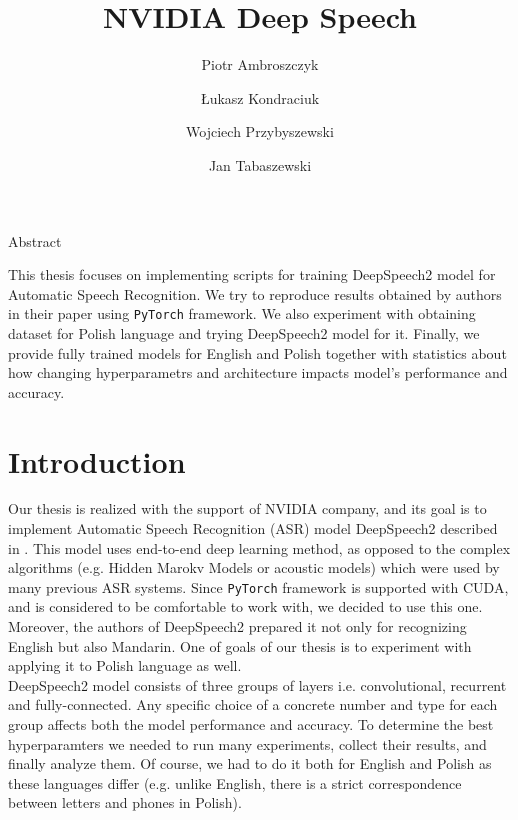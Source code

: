 ﻿\documentclass[11pt,a4paper]{article}
\title{NVIDIA Deep Speech}
\author{Piotr Ambroszczyk
\and Łukasz Kondraciuk
\and Wojciech Przybyszewski
\and Jan Tabaszewski}
\date{}
\begin{document}
\begin{titlingpage}
\maketitle
\end{titlingpage}

\begin{center}
Abstract
\end{center}
This thesis focuses on implementing scripts for training DeepSpeech2 model for Automatic Speech Recognition. We try to reproduce results obtained by authors in their paper using \texttt{PyTorch} framework. We also experiment with obtaining dataset for Polish language and trying DeepSpeech2 model for it. Finally, we provide fully trained models for English and Polish together with statistics about how changing hyperparametrs and architecture impacts model's performance and accuracy.
\newpage

\tableofcontents
\newpage

\section{Introduction}

Our thesis is realized with the support of NVIDIA company, and its goal is to implement Automatic Speech Recognition (ASR) model DeepSpeech2 described in \cite{DS2}. This model uses end-to-end deep learning method, as opposed to the complex algorithms (e.g. Hidden Marokv Models or acoustic models) which were used by many previous ASR systems. Since \texttt{PyTorch} framework is supported with CUDA, and is considered to be comfortable to work with, we decided to use this one. Moreover, the authors of DeepSpeech2 prepared it not only for recognizing English but also Mandarin. One of goals of our thesis is to experiment with applying it to Polish language as well.\\

DeepSpeech2 model consists of three groups of layers i.e. convolutional, recurrent and fully-connected. Any specific choice of a concrete number and type for each group affects both the model performance and accuracy. To determine the best hyperparamters  we needed to run many experiments, collect their results, and finally analyze them. Of course, we had to do it both for English and Polish as these languages differ (e.g. unlike English, there is a strict correspondence between letters and phones in Polish).\\
\end{document}
